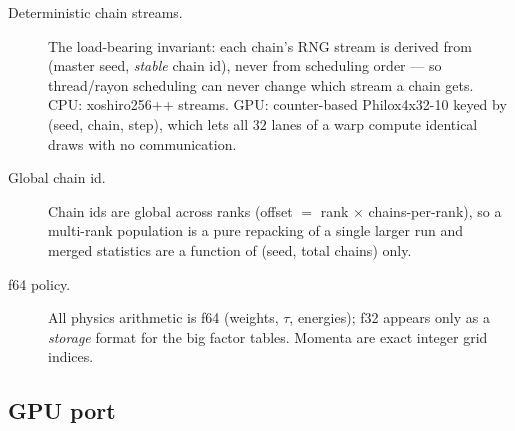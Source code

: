 \documentclass[11pt]{article}
\newcommand{\term}[1]{\item[#1.]}
\begin{document}
\begin{description}
\term{Deterministic chain streams} The load-bearing invariant: each chain's RNG
  stream is derived from (master seed, \emph{stable} chain id), never from scheduling
  order --- so thread/rayon scheduling can never change which stream a chain gets.
  CPU: xoshiro256++ streams. GPU: counter-based Philox4x32-10 keyed by
  (seed, chain, step), which lets all $32$ lanes of a warp compute identical draws
  with no communication.

\term{Global chain id} Chain ids are global across ranks (offset $=$
  rank $\times$ chains-per-rank), so a multi-rank population is a pure repacking of a
  single larger run and merged statistics are a function of (seed, total chains)
  only.

\term{f64 policy} All physics arithmetic is f64 (weights, $\tau$, energies);
  f32 appears only as a \emph{storage} format for the big factor tables. Momenta are
  exact integer grid indices.
\end{description}

\subsection{GPU port}
\end{document}
